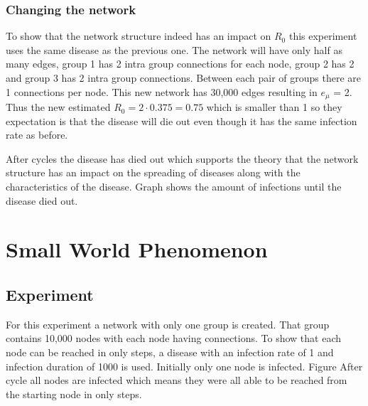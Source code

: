\subsubsection{Changing the network}
To show that the network structure indeed has an impact on $R_0$ this experiment
uses the same disease as the previous one. The network will have only half as many
edges, group 1 has 2 intra group connections for each node, group 2 has 2 and
group 3 has 2 intra group connections. Between each pair of groups there are
1 connections per node. This new network has 30,000 edges resulting in $e_\mu$ = 2.
Thus the new estimated $R_0=2\cdot0.375=0.75$ which is smaller than 1 so they
expectation is that the disease will die out even though it has the same infection 
rate as before.

After %
cycles the disease has died out which supports the theory that the network structure
has an impact on the spreading of diseases along with the characteristics of the disease.
Graph %
shows the amount of infections until the disease died out.

\section{Small World Phenomenon}

\subsection{Experiment}
For this experiment a network with only one group is created. That group
contains 10,000 nodes with each node having %
connections. To show that each node can be reached in only %
steps, a disease with an infection rate of 1 and infection duration of
1000 is used. Initially only one
node is infected. Figure %
After cycle %
all nodes are infected which means they were all able to be reached from the 
starting node in only %
steps.



